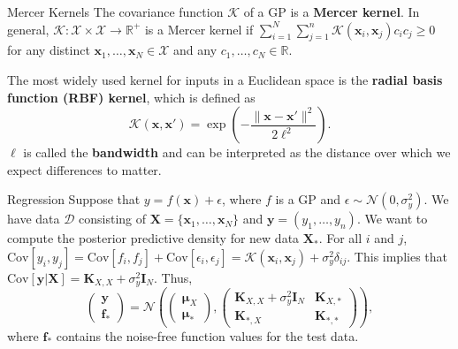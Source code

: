 \documentclass{beamer}
\begin{document}
\begin{frame}{Mercer Kernels}
    The covariance function $\mathcal{K}$ of a GP is a \textbf{Mercer kernel}. In general, $\mathcal{K} : \mathcal{X} \times \mathcal{X} \to \mathbb{R}^+$ is a Mercer kernel if $\sum_{i = 1}^N \sum_{j = 1}^n \mathcal{K}(\boldsymbol{x}_i, \boldsymbol{x}_j)c_i c_j \ge 0$ for any distinct $\boldsymbol{x}_1, \ldots, \boldsymbol{x}_N \in \mathcal{X}$ and any $c_1, \ldots, c_N \in \mathbb{R}$.
    
    \medskip
    
    The most widely used kernel for inputs in a Euclidean space is the \textbf{radial basis function (RBF) kernel}, which is defined as
    \[
    \mathcal{K}(\boldsymbol{x}, \boldsymbol{x}') = \exp\left(-\frac{\|\boldsymbol{x} - \boldsymbol{x}'\|^2}{2\ell^2}\right).
    \]
    $\ell$ is called the \textbf{bandwidth} and can be interpreted as the distance over which we expect differences to matter.
\end{frame}

\begin{frame}{Regression}
    Suppose that $y = f(\boldsymbol{x}) + \epsilon$, where $f$ is a GP and $\epsilon \sim \mathcal{N}(0, \sigma_y^2)$. We have data $\mathcal{D}$ consisting of $\boldsymbol{X} = \{\boldsymbol{x}_1, \ldots, \boldsymbol{x}_N\}$ and $\boldsymbol{y} = (y_1, \ldots, y_n)$. We want to compute the posterior predictive density for new data $\boldsymbol{X}_*$. For all $i$ and $j$, $\text{Cov}[y_i, y_j] = \text{Cov}[f_i, f_j] + \text{Cov}[\epsilon_i, \epsilon_j] = \mathcal{K}(\boldsymbol{x}_i, \boldsymbol{x}_j) + \sigma_y^2 \delta_{i j}$. This implies that $\text{Cov}[\boldsymbol{y} | \boldsymbol{X}] = \boldsymbol{K}_{X, X} + \sigma_y^2 \boldsymbol{I}_N$. Thus,
    \[
    \left(\begin{matrix} \boldsymbol{y} \\ \boldsymbol{f}_* \end{matrix}\right) = \mathcal{N}\left(\left(\begin{matrix} \boldsymbol{\mu}_X \\ \boldsymbol{\mu}_* \end{matrix}\right), \left(\begin{matrix} \boldsymbol{K}_{X, X} + \sigma_y^2 \boldsymbol{I}_N & \boldsymbol{K}_{X, *} \\ \boldsymbol{K}_{*, X} & \boldsymbol{K}_{*, *} \end{matrix}\right)\right),
    \]
    where $\boldsymbol{f}_*$ contains the noise-free function values for the test data.
\end{frame}
\end{document}
